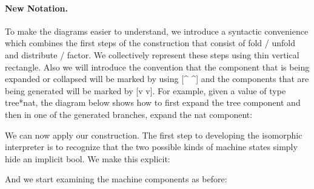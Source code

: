 \documentclass{llncs}
\begin{document}
{\paragraph*{New Notation.}
To make the diagrams easier to understand, we introduce a syntactic
convenience which combines the first steps of the construction that consist
of {{fold}} / {{unfold}} and {{distribute}} / {{factor}}. We collectively
represent these steps using thin vertical rectangle. Also we will introduce
the convention that the component that is being expanded or collapsed will be
marked by using {{[^ ^]}} and the components that are being generated will be
marked by {{[v v]}}. For example, given a value of type {{tree*nat}}, the
diagram below shows how to first expand the {{tree}} component and then in
one of the generated branches, expand the {{nat}} component:

\begin{center}
\end{center}

We can now apply our construction. The first step to developing the
isomorphic interpreter is to recognize that the two possible kinds of machine
states simply hide an implicit {{bool}}. We make this explicit:

\begin{multicols}{2}
%

\end{multicols}

And we start examining the machine components as before:

\begin{center}
\end{center}

}
\end{document}
